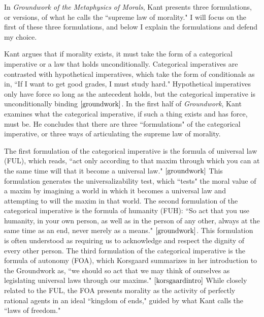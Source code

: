 %
\begin{isabellebody}%
%
%
\isadelimtheory
%
\endisadelimtheory
%
\isatagtheory
%
\endisatagtheory
{\isafoldtheory}%
%
\isadelimtheory
%
\endisadelimtheory
%
\isadelimdocument
%
\endisadelimdocument
%
\isatagdocument
%
\isamarkuptrue%
%
\endisatagdocument
{\isafolddocument}%
%
\isadelimdocument
%
\endisadelimdocument
%
\begin{isamarkuptext}%
In \emph{Groundwork of the Metaphysics of Morals}, Kant presents three formulations, or versions, 
of what he calls the ``supreme law of morality." I will focus on the first of these three formulations, 
and below I explain the formulations and defend my choice.

Kant argues that if  morality 
exists, it must take the form of a categorical imperative or a law that holds unconditionally. Categorical
imperatives are contrasted with hypothetical imperatives, which take the form of conditionals as in, 
``If I want to get good grades, I must study hard." Hypothetical imperatives only have force so long
as the antecedent holds, but the categorical imperative is unconditionally binding $\cite[28]{groundwork}$. In the first 
half of \emph{Groundwork}, Kant examines what the categorical imperative, if such a thing exists and has force,
must be. He concludes that there are three ``formulations" of the categorical imperative, or three ways 
of articulating the supreme law of morality. 

The first formulation of the categorical imperative is the
formula of universal law (FUL), which reads, ``act only according to that maxim through which you can 
at the same time will that it become a universal law." $\cite[34]{groundwork}$ This formulation
generates the universalizability test, which ``tests" the moral value of a maxim by 
imagining a world in which it becomes a universal law and attempting to will the maxim in that world. The 
second formulation of the categorical imperative is the formula of humanity (FUH): ``So act that you use humanity, 
in your own person, as well as in the person of any other, always at the same time as an end, never merely 
as a means." $\cite[41]{groundwork}$. This formulation is often understood as requiring us to 
acknowledge and respect the dignity of every other person. The third formulation of the categorical 
imperative is the formula of autonomy (FOA), which Korsgaard summarizes in her introduction to the Groundwork 
as, ``we should so act that we may think of ourselves as legislating universal laws through our 
maxims." $\cite[28]{korsgaardintro}$ While closely related to the FUL, the FOA presents morality as the activity of 
perfectly rational agents in an ideal ``kingdom of ends," guided by what Kant calls the ``laws of freedom."


\end{isamarkuptext}
\end{isabellebody}
